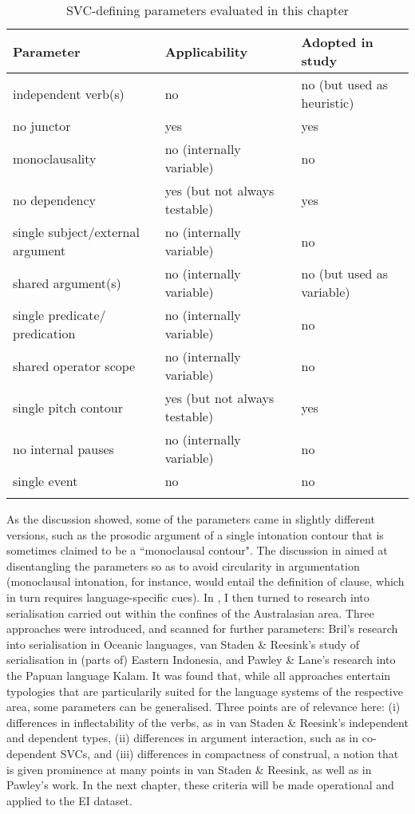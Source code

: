 \begin{table}
    \centering
    \begin{footnotesize}
    \begin{tabular}{l l l}
    \lsptoprule
Parameter & Applicability & Adopted in study \\
\midrule
independent verb(s) & no & no (but used as heuristic) \\
\tablevspace
no junctor & yes & yes \\
\tablevspace
monoclausality & no (internally variable) & no \\
\tablevspace
no dependency & yes (but not always testable) & yes \\
\tablevspace
single subject/external argument & no (internally variable) & no \\
\tablevspace
shared argument(s) & no (internally variable) & no (but used as variable) \\
\tablevspace
single predicate/ predication & no (internally variable) & no \\
\tablevspace
shared operator scope & no (internally variable) & no \\
\tablevspace
single pitch contour & yes (but not always testable) & yes \\
\tablevspace
no internal pauses & no (internally variable) & no \\
\tablevspace
single event & no & no \\
\lspbottomrule
    \end{tabular}
    \end{footnotesize}
    \caption{SVC-defining parameters evaluated in this chapter}
    \label{tab:parameters_used}
\end{table}

As the discussion showed, some of the parameters came in slightly different versions, such as the prosodic argument of a single intonation contour that is sometimes claimed to be a ``monoclausal contour". The discussion in  aimed at disentangling the parameters so as to avoid circularity in argumentation (monoclausal intonation, for instance, would entail the definition of clause, which in turn requires language-specific cues). In , I then turned to research into serialisation carried out within the confines of the Australasian area. Three approaches were introduced, and scanned for further parameters: Bril's research into serialisation in Oceanic languages, van Staden \& Reesink's study of serialisation in (parts of) Eastern Indonesia, and Pawley \& Lane's research into the Papuan language Kalam. It was found that, while all approaches entertain typologies that are particularily suited for the language systems of the respective area, some parameters can be generalised. Three points are of relevance here: (i) differences in inflectability of the verbs, as in van Staden \& Reesink's independent and dependent types, (ii) differences in argument interaction, such as in co-dependent SVCs, and (iii) differences in compactness of construal, a notion that is given prominence at many points in van Staden \& Reesink, as well as in Pawley's work. In the next chapter, these criteria will be made operational and applied to the EI dataset.

